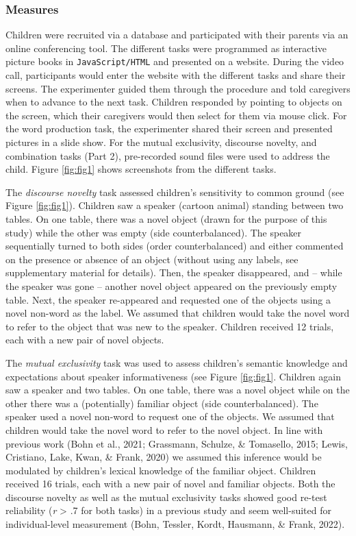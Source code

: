 \documentclass[
  man,floatsintext]{apa6}
\begin{document}
\hypertarget{measures}{%
\subsubsection{Measures}\label{measures}}

Children were recruited via a database and participated with their parents via an online conferencing tool. The different tasks were programmed as interactive picture books in \texttt{JavaScript/HTML} and presented on a website. During the video call, participants would enter the website with the different tasks and share their screens. The experimenter guided them through the procedure and told caregivers when to advance to the next task. Children responded by pointing to objects on the screen, which their caregivers would then select for them via mouse click. For the word production task, the experimenter shared their screen and presented pictures in a slide show. For the mutual exclusivity, discourse novelty, and combination tasks (Part 2), pre-recorded sound files were used to address the child. Figure \ref{fig:fig1} shows screenshots from the different tasks.

The \emph{discourse novelty} task assessed children's sensitivity to common ground (see Figure \ref{fig:fig1}). Children saw a speaker (cartoon animal) standing between two tables. On one table, there was a novel object (drawn for the purpose of this study) while the other was empty (side counterbalanced). The speaker sequentially turned to both sides (order counterbalanced) and either commented on the presence or absence of an object (without using any labels, see supplementary material for details). Then, the speaker disappeared, and -- while the speaker was gone -- another novel object appeared on the previously empty table. Next, the speaker re-appeared and requested one of the objects using a novel non-word as the label. We assumed that children would take the novel word to refer to the object that was new to the speaker. Children received 12 trials, each with a new pair of novel objects.

The \emph{mutual exclusivity} task was used to assess children's semantic knowledge and expectations about speaker informativeness (see Figure \ref{fig:fig1}. Children again saw a speaker and two tables. On one table, there was a novel object while on the other there was a (potentially) familiar object (side counterbalanced). The speaker used a novel non-word to request one of the objects. We assumed that children would take the novel word to refer to the novel object. In line with previous work (Bohn et al., 2021; Grassmann, Schulze, \& Tomasello, 2015; Lewis, Cristiano, Lake, Kwan, \& Frank, 2020) we assumed this inference would be modulated by children's lexical knowledge of the familiar object. Children received 16 trials, each with a new pair of novel and familiar objects. Both the discourse novelty as well as the mutual exclusivity tasks showed good re-test reliability (\emph{r} \textgreater{} .7 for both tasks) in a previous study and seem well-suited for individual-level measurement (Bohn, Tessler, Kordt, Hausmann, \& Frank, 2022).
\end{document}
